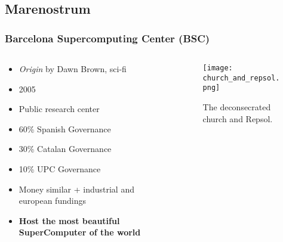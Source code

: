 \subsection{Marenostrum}

\begin{frame}
\frametitle{Barcelona Supercomputing Center (BSC)}
	\begin{columns}
	\begin{column}{0.4\textwidth}
		\begin{itemize}
			\item \textit{Origin} by Dawn Brown, sci-fi
			\item 2005
			\item Public research center
			\item 60\% Spanish Governance
			\item 30\% Catalan Governance
			\item 10\% UPC Governance
			\item Money similar + industrial and european fundings
			\item \textbf{Host the most beautiful SuperComputer of the world}
		\end{itemize}
	\end{column}
	\begin{column}{0.6\textwidth}
		\begin{figure}[H]
			\centering
			\texttt{[image: church\_and\_repsol.png]}
			\caption{The deconsecrated church and Repsol.}
		\end{figure}
	\end{column}
	\end{columns}
\end{frame}


